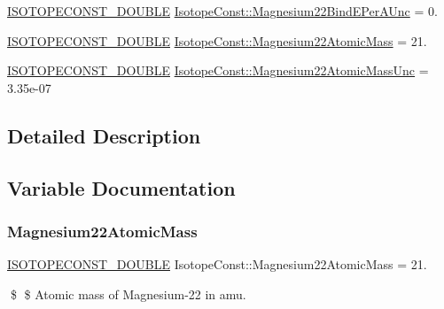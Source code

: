 \begin{DoxyCompactItemize}
\mbox{\hyperlink{group___isotope_const-_macros_ga8f45a7272ce02c0b4c65c44636ed719a}{I\+S\+O\+T\+O\+P\+E\+C\+O\+N\+S\+T\+\_\+\+D\+O\+U\+B\+LE}} \mbox{\hyperlink{group___isotope_const-_magnesium-_mg22_ga34ba4d29cd3d4e329a8eae9da93e4d71}{Isotope\+Const\+::\+Magnesium22\+Bind\+E\+Per\+A\+Unc}} = 0.
\item 
\mbox{\hyperlink{group___isotope_const-_macros_ga8f45a7272ce02c0b4c65c44636ed719a}{I\+S\+O\+T\+O\+P\+E\+C\+O\+N\+S\+T\+\_\+\+D\+O\+U\+B\+LE}} \mbox{\hyperlink{group___isotope_const-_magnesium-_mg22_gae9b94d6a55b6f9cb283b9b28a65731a6}{Isotope\+Const\+::\+Magnesium22\+Atomic\+Mass}} = 21.
\item 
\mbox{\hyperlink{group___isotope_const-_macros_ga8f45a7272ce02c0b4c65c44636ed719a}{I\+S\+O\+T\+O\+P\+E\+C\+O\+N\+S\+T\+\_\+\+D\+O\+U\+B\+LE}} \mbox{\hyperlink{group___isotope_const-_magnesium-_mg22_gab898aeba1a967c92837bb85912e09985}{Isotope\+Const\+::\+Magnesium22\+Atomic\+Mass\+Unc}} = 3.\+35e-\/07
\end{DoxyCompactItemize}


\subsection{Detailed Description}


\subsection{Variable Documentation}
\mbox{\label{group___isotope_const-_magnesium-_mg22_gae9b94d6a55b6f9cb283b9b28a65731a6}} 
\subsubsection{\texorpdfstring{Magnesium22\+Atomic\+Mass}{Magnesium22AtomicMass}}
{\footnotesize\ttfamily \mbox{\hyperlink{group___isotope_const-_macros_ga8f45a7272ce02c0b4c65c44636ed719a}{I\+S\+O\+T\+O\+P\+E\+C\+O\+N\+S\+T\+\_\+\+D\+O\+U\+B\+LE}} Isotope\+Const\+::\+Magnesium22\+Atomic\+Mass = 21.}

\$ \$ Atomic mass of Magnesium-\/22 in amu. \mbox{\label{group___isotope_const-_magnesium-_mg22_gab898aeba1a967c92837bb85912e09985}} 

